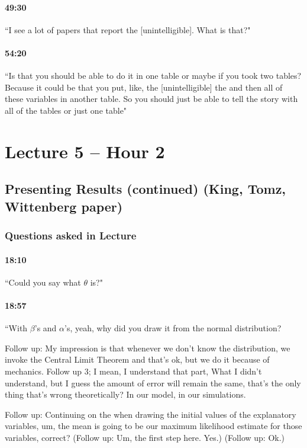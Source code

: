 \documentclass[11pt]{article}
\begin{document}
\paragraph{49:30} ``I see a lot of papers that report the [unintelligible]. What is that?"

\paragraph{54:20} ``Is that you should be able to do it in one table or maybe if you took two tables? Because it could be that you put, like, the [unintelligible] the and then all of these variables in another table. So you should just be able to tell the story with all of the tables or just one table"


\section{Lecture 5 -- Hour 2}

\subsection{Presenting Results (continued) (King, Tomz, Wittenberg paper)}

\subsubsection{Questions asked in Lecture}

\paragraph{18:10} ``Could you say what $\theta$ is?"

\paragraph{18:57} ``With $\beta$'s and $\alpha$'s, yeah, why did you draw it from the normal distribution? 

Follow up: My impression is that whenever we don't know the distribution, we invoke the Central Limit Theorem and that's ok, but we do it because of mechanics. Follow up 3; I mean, I understand that part, What I didn't understand, but I guess the amount of error will remain the same, that's the only thing that's wrong theoretically? In our model, in our simulations.

Follow up: Continuing on the when drawing the initial values of the explanatory variables, um, the mean is going to be our maximum likelihood estimate for those variables, correct? (Follow up: Um, the first step here. Yes.) (Follow up: Ok.)
\end{document}
